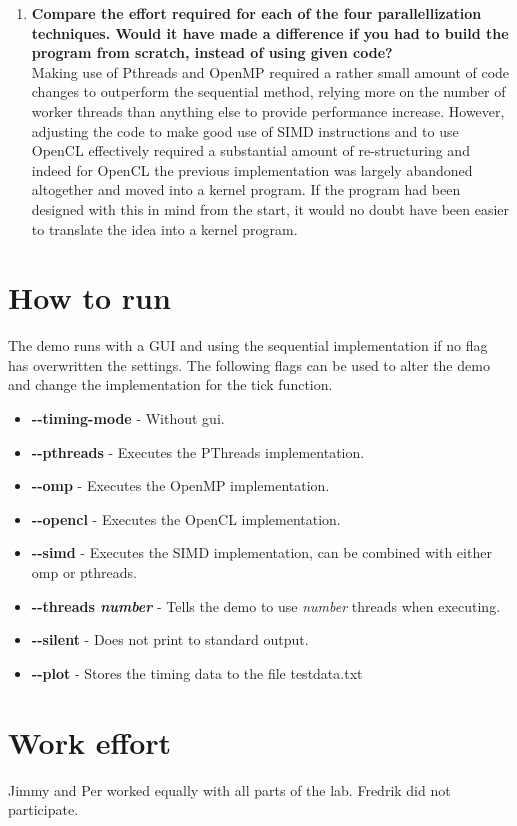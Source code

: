 \documentclass[a4paper,11pt]{article}
\begin{document}
\begin{enumerate}[label=\Alph*.]
\item \textbf{Compare the effort required for each of the four
  parallellization techniques. Would it have made a difference if you
  had to build the program from scratch, instead of using given
  code?}\\ Making use of Pthreads and OpenMP required a rather small
  amount of code changes to outperform the sequential method, relying
  more on the number of worker threads than anything else to provide
  performance increase. However, adjusting the code to make good use
  of SIMD instructions and to use OpenCL effectively required a
  substantial amount of re-structuring and indeed for OpenCL the
  previous implementation was largely abandoned altogether and moved
  into a kernel program. If the program had been designed with this in
  mind from the start, it would no doubt have been easier to translate
  the idea into a kernel program.
\end{enumerate}
\section{How to run}
The demo runs with a GUI and using the sequential implementation if no
flag has overwritten the settings. The following flags can be used to
alter the demo and change the implementation for the tick function.
\begin{itemize}[label=,leftmargin=0pt]
\item \textbf{-\--timing-mode} - Without gui.
\item \textbf{-\--pthreads} - Executes the PThreads implementation.
\item \textbf{-\--omp} - Executes the OpenMP implementation.
\item \textbf{-\--opencl} - Executes the OpenCL implementation.
\item \textbf{-\--simd} - Executes the SIMD implementation, can be
  combined with either omp or pthreads.
\item \textbf{-\--threads \textit{number}} - Tells the demo to use
  \textit{number} threads when executing.
\item \textbf{-\--silent} - Does not print to standard output.
\item \textbf{-\--plot} - Stores the timing data to the file
  testdata.txt
\end{itemize}
\section*{Work effort}
Jimmy and Per worked equally with all parts of the lab. Fredrik did not participate.
\end{document}
